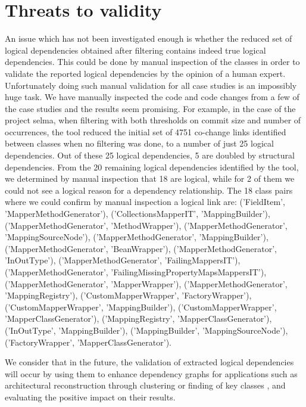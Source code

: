 \documentclass[a4paper,twoside]{article}
\begin{document}
\section {Threats to validity}
\label{sec:validity}


An issue which has not been investigated enough is whether the reduced set of logical dependencies obtained after filtering contains indeed true logical dependencies. This could be done by manual inspection of the classes in order to validate the reported logical dependencies by the opinion of a human expert. Unfortunately doing such manual validation for all case studies is an impossibly huge task. We have manually inspected the code and code changes from a few of the case studies and the results seem promising. For example, in the case of the project selma, when filtering with both thresholds on commit size and number of occurrences, the tool reduced the initial set of 4751 co-change links identified between classes when no filtering was done, to a number of just 25 logical dependencies. Out of these 25 logical dependencies, 5 are doubled by structural dependencies. From the 20 remaining logical dependencies identified by the tool, we determined by manual inspection that 18 are logical, while for 2 of them we could not see a logical reason for a dependency relationship. 
The 18 class pairs where we could confirm by manual inspection a logical link are: ('FieldItem', 'MapperMethodGenerator'),  ('CollectionsMapperIT', 'MappingBuilder'), ('MapperMethodGenerator', 'MethodWrapper'), ('MapperMethodGenerator', 'MappingSourceNode'),  ('MapperMethodGenerator', 'MappingBuilder'), ('MapperMethodGenerator', 'BeanWrapper'), ('MapperMethodGenerator', 'InOutType'), ('MapperMethodGenerator', 'FailingMappersIT'),  ('MapperMethodGenerator', 'FailingMissingPropertyMapsMappersIT'), ('MapperMethodGenerator', 'MapperWrapper'), ('MapperMethodGenerator', 'MappingRegistry'),  ('CustomMapperWrapper', 'FactoryWrapper'),  ('CustomMapperWrapper', 'MappingBuilder'),  ('CustomMapperWrapper', 'MapperClassGenerator'), ('MappingRegistry', 'MapperClassGenerator'), ('InOutType', 'MappingBuilder'),  ('MappingBuilder', 'MappingSourceNode'),  ('FactoryWrapper', 'MapperClassGenerator').

We consider that in the future, the validation of extracted logical dependencies will occur by using them to enhance dependency graphs for  applications such as architectural reconstruction through clustering \cite{SoraConti} or finding of key classes \cite{PagerankENASE}, and evaluating the positive impact on their results.   
\end{document}
